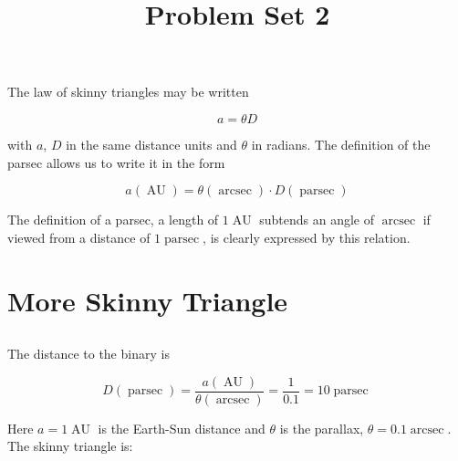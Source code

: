 \documentclass[11pt]{scrartcl}
\title{Problem Set 2}
\DeclareMathOperator{\AU}{AU}
\DeclareMathOperator{\arcsec}{arcsec}
\DeclareMathOperator{\parsec}{parsec}
\begin{document}
\maketitle

The law of skinny triangles may be written 

\[a = \theta D\]

with $a$, $D$ in the same distance units and $\theta$ in radians. The definition of the parsec allows us to write it in the form

\[a(\AU) = \theta(\arcsec) \cdot D (\parsec)\]

The definition of a parsec, a length of $1\AU$ subtends an angle of $\arcsec$ if viewed from a distance of $1 \parsec$, is clearly expressed by this relation.

\section{More Skinny Triangle}

\subsection{}

The distance to the binary is

\[D(\parsec) = \frac{a(\AU)}{\theta(\arcsec)} = \frac{1}{0.1} = 10\parsec\]

Here $a = 1\AU$ is the Earth-Sun distance and $\theta$ is the parallax, $\theta = 0.1\arcsec$. The skinny triangle is:
\end{document}
